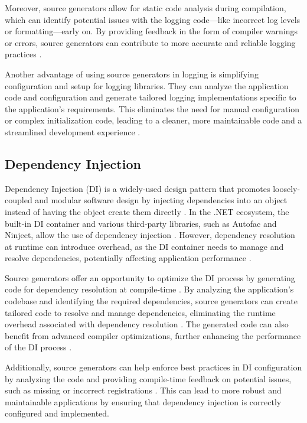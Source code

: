 Moreover, source generators allow for static code analysis during compilation, which can identify potential issues with the logging code—like incorrect log levels or formatting—early on. By providing feedback in the form of compiler warnings or errors, source generators can contribute to more accurate and reliable logging practices \cite{Torgersen2020}.

Another advantage of using source generators in logging is simplifying configuration and setup for logging libraries. They can analyze the application code and configuration and generate tailored logging implementations specific to the application's requirements. This eliminates the need for manual configuration or complex initialization code, leading to a cleaner, more maintainable code and a streamlined development experience \cite{CSharpRoslyn}.

\subsection{Dependency Injection}

Dependency Injection (DI) is a widely-used design pattern that promotes loosely-coupled and modular software design by injecting dependencies into an object instead of having the object create them directly \cite{Martin2003}. In the .NET ecosystem, the built-in DI container and various third-party libraries, such as Autofac and Ninject, allow the use of dependency injection \cite{DIContainers}. However, dependency resolution at runtime can introduce overhead, as the DI container needs to manage and resolve dependencies, potentially affecting application performance \cite{Blumhardt2010}.

Source generators offer an opportunity to optimize the DI process by generating code for dependency resolution at compile-time \cite{CSharpRoslyn}. By analyzing the application's codebase and identifying the required dependencies, source generators can create tailored code to resolve and manage dependencies, eliminating the runtime overhead associated with dependency resolution \cite{Carter2020}. The generated code can also benefit from advanced compiler optimizations, further enhancing the performance of the DI process \cite{Torgersen2020}.

Additionally, source generators can help enforce best practices in DI configuration by analyzing the code and providing compile-time feedback on potential issues, such as missing or incorrect registrations \cite{CSharpRoslyn}. This can lead to more robust and maintainable applications by ensuring that dependency injection is correctly configured and implemented.

